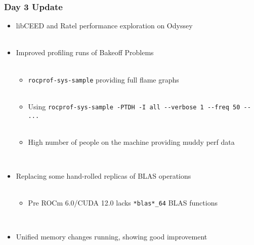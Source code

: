 \documentclass{beamer}
\begin{document}
\begin{frame}
\begin{center}
\frametitle{Day 3 Update}

\begin{itemize}

\item libCEED and Ratel performance exploration on Odyssey\\

~\\

\item Improved profiling runs of Bakeoff Problems\\

~\\

\begin{itemize}

\item \lstinline{rocprof-sys-sample} providing full flame graphs\\

~\\

\item Using \lstinline{rocprof-sys-sample -PTDH -I all --verbose 1 --freq 50 -- ...}\\

~\\

\item High number of people on the machine providing muddy perf data\\

\end{itemize}

~\\

\item Replacing some hand-rolled replicas of BLAS operations\\

~\\

\begin{itemize}

\item Pre ROCm 6.0/CUDA 12.0 lacks \lstinline{*blas*_64} BLAS functions\\

\end{itemize}

~\\

\item Unified memory changes running, showing good improvement\\

\end{itemize}

\end{center}
\end{frame}
\end{document}
